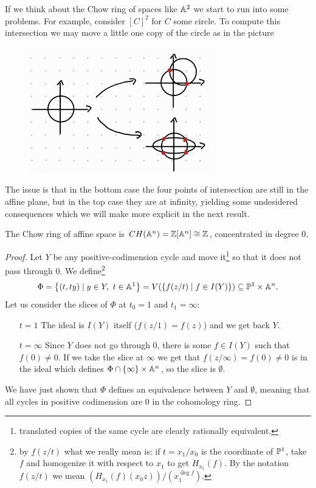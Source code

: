 \begin{example}
If we think about the Chow ring of spaces like $\mathbb{A}^2$ we start to run into some problems. For example, consider $[C]^2$ for $C$ some circle. To compute this intersection we may move a little one copy of the circle as in the picture
\begin{figure}[!htb]
	\centering
	\includegraphics[width=8cm]{Images/circle-intersect-itself.png}
\end{figure}

The issue is that in the bottom case the four points of intersection are still in the affine plane, but in the top case they are at infinity, yielding some undesidered consequences which we will make more explicit in the next result.
\end{example}


\begin{proposition}
The Chow ring of affine space is $CH(\mathbb{A}^n)=\mathbb{Z}[\mathbb{A}^n]\cong \mathbb{Z}$, concentrated in degree 0.
\end{proposition}
\begin{proof}
Let $Y$ be any positive-codimension cycle and move it\footnote{translated copies of the same cycle are clearly rationally equivalent.} so that it does not pass through $0$.
We define\footnote{by $f(z/t)$ what we really mean is: if $t=x_1/x_0$ is the coordinate of $\mathbb{P}^1$, take $f$ and homogenize it with respect to $x_1$ to get $H_{x_1}(f)$. By the notation $f(z/t)$ we mean $(H_{x_1}(f)(x_0 z))/(x_1^{\deg f})$.}
\[\Phi=\left\{{(t,ty)\mid y\in Y,\ t\in \mathbb{A}^1}\right\}=V(\left\{{f(z/t)\mid f\in I(Y)}\right\})\subseteq \mathbb{P}^1\times \mathbb{A}^n.\]
Let us consider the slices of $\Phi$ at $t_0=1$ and $t_1=\infty$: 
\setlength{\leftmargini}{0cm}
\begin{itemize}
\item[$\boxed{t=1}$] The ideal is $I(Y)$ itself ($f(z/1)=f(z)$) and we get back $Y$.
\item[$\boxed{t=\infty}$] Since $Y$ does not go through $0$, there is some $f\in I(Y)$ such that $f(0)\neq 0$. If we take the slice at $\infty$ we get that $f(z/\infty)=f(0)\neq 0$ is in the ideal which defines $\Phi\cap \left\{{\infty}\right\}\times \mathbb{A}^n$, so the slice is $\emptyset$.
\end{itemize}
\setlength{\leftmargini}{0.5cm}
We have just shown that $\Phi$ defines an equivalence between $Y$ and $\emptyset$, meaning that all cycles in positive codimension are $0$ in the cohomology ring.
\end{proof}

